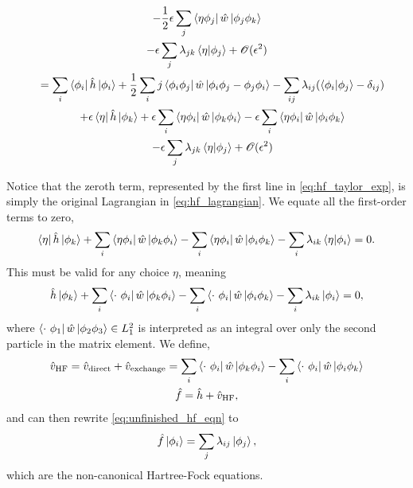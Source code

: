 \begin{gather}
\begin{gathered}
            - \frac{1}{2} \epsilon \sum_j \bra{\eta\phi_j} \hat{w}
                \ket{\phi_j \phi_k} \\
            - \epsilon \sum_j \lambda_{jk}\braket{\eta}{\phi_j}
            + \mathscr{O}(\epsilon^2) 
        \end{gathered} \\
        \quad
        \begin{gathered}
            \label{eq:hf_taylor_exp}
            =
            \sum_i \bra{\phi_i} \hat{h} \ket{\phi_i} 
            + \frac{1}{2} \sum_ij \bra{\phi_i \phi_j} \hat{w} 
                    \ket{\phi_i \phi_j - \phi_j \phi_i}
            - \sum_{ij}\lambda_{ij}(\braket{\phi_i}{\phi_j} - \delta_{ij}) \\
            + \epsilon\bra{\eta} \hat{h} \ket{\phi_k}
            + \epsilon \sum_i \bra{\eta\phi_i} \hat{w} \ket{\phi_k \phi_i}
            - \epsilon \sum_i \bra{\eta\phi_i} \hat{w} \ket{\phi_i \phi_k} \\
            - \epsilon \sum_j \lambda_{jk}\braket{\eta}{\phi_j}
            + \mathscr{O}(\epsilon^2) 
        \end{gathered}
    \end{gather}

Notice that the zeroth term, represented by the first line in \autoref{eq:hf_taylor_exp},
is simply the original Lagrangian in \autoref{eq:hf_lagrangian}. We equate all the 
first-order terms to zero,
\begin{equation}
    \bra{\eta} \hat{h} \ket{\phi_k} 
    + \sum_i \bra{\eta \phi_i} \hat{w} \ket{\phi_k\phi_i}
    - \sum_i \bra{\eta \phi_i} \hat{w} \ket{\phi_i\phi_k}
    - \sum_i \lambda_{ik} \braket{\eta}{\phi_i} = 0.
\end{equation}
This must be valid for any choice $\eta$, meaning
\begin{equation}
    \label{eq:unfinished_hf_eqn}
    \hat{h} \ket{\phi_k} 
    + \sum_i \bra{\cdot\ \phi_i} \hat{w} \ket{\phi_k\phi_i}
    - \sum_i \bra{\cdot\ \phi_i} \hat{w} \ket{\phi_i\phi_k}
    - \sum_i \lambda_{ik} \ket{\phi_i} = 0,
\end{equation}
where $\bra{\cdot\ \phi_1} \hat{w} \ket{\phi_2 \phi_3} \in L_1^2$ is interpreted
as an integral over only the second particle in the matrix element. We define,
\begin{gather}
    \hat{v}_{\text{HF}} = \hat{v}_{\text{direct}} + \hat{v}_{\text{exchange}}
        =\sum_i \bra{\cdot\ \phi_i} \hat{w} \ket{\phi_k\phi_i}
        -\sum_i \bra{\cdot\ \phi_i} \hat{w} \ket{\phi_i\phi_k} \\
    \hat{f} = \hat{h} + \hat{v}_{\text{HF}},
\end{gather}
and can then rewrite \autoref{eq:unfinished_hf_eqn} to 
\begin{equation}
    \hat{f}\ket{\phi_i} = \sum_j \lambda_{ij}\ket{\phi_j},
\end{equation} 
which are the non-canonical Hartree-Fock equations.